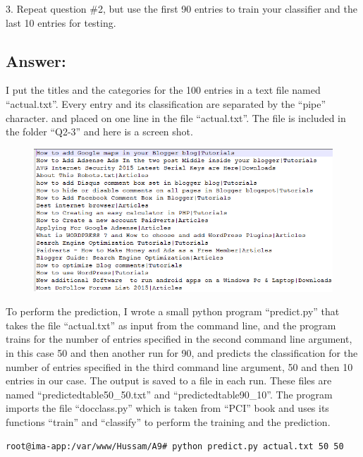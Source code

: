 \documentclass[a4paper, 11pt]{article}
\begin{document}
3. Repeat question \#2, but use the first 90 entries to train your
classifier and the last 10 entries for testing.

\subsection*{Answer:}

I put the titles and the categories for the 100 entries in a text file named ``actual.txt''. Every entry and its classification are separated by the ``pipe'' character. and placed on one line in the file ``actual.txt''. The file is included in the folder ``Q2-3'' and here is a screen shot.

\begin{figure}[H]
\centering
\includegraphics[scale=0.7]{actual.png}
\end{figure}

To perform the prediction, I wrote a small python program ``predict.py'' that takes the file ``actual.txt'' as input from the command line, and the program trains for the number of entries specified in the second command line argument, in this case 50 and then another run for 90, and predicts the classification for the number of entries specified in the third command line argument, 50 and then 10 entries in our case. The output is saved to a file in each run. These files are named ``predictedtable50\_50.txt'' and ``predictedtable90\_10''. The program imports the file ``docclass.py'' which is taken from ``PCI'' book and uses its functions ``train'' and ``classify'' to perform the training and the prediction.



\begin{lstlisting}[language=bash, breakatwhitespace=〈false), label=Running predict.py: Training 50 Predicting 50, caption= Running predict.py: Training 50 Predicting 50]
root@ima-app:/var/www/Hussam/A9# python predict.py actual.txt 50 50
\end{lstlisting}
\end{document}
